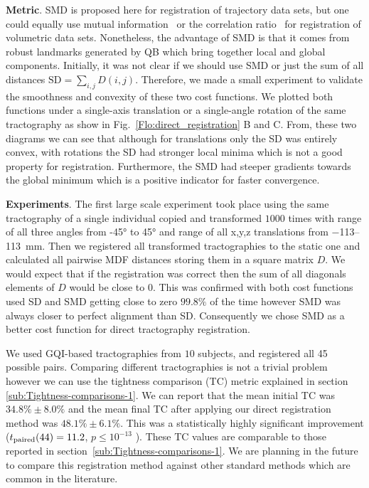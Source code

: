 \documentclass[preprint,authoryear,a4paper,10pt,onecolumn]{elsarticle}
\begin{document}
\textbf{Metric}. SMD is proposed here for registration of trajectory
data sets, but one could equally use mutual
information~\citep{maes1997multimodality} or the correlation
ratio~\citep{roche1998correlation} for registration of volumetric data
sets. Nonetheless, the advantage of SMD is that it comes from robust
landmarks generated by QB which bring together local and global
components. Initially, it was not clear if we should use SMD or just the
sum of all distances $\mathrm{SD}=\sum_{i,j}D(i,j)$. Therefore, we made
a small experiment to validate the smoothness and convexity of these two
cost functions. We plotted both functions under a single-axis
translation or a single-angle rotation of the same tractography as show
in Fig.~\ref{Flo:direct_registration} B and C. From, these two diagrams
we can see that although for translations only the SD was entirely
convex, with rotations the SD had stronger local minima which is not a
good property for registration. Furthermore, the SMD had steeper
gradients towards the global minimum which is a positive indicator for
faster convergence.

\textbf{Experiments}. The first large scale experiment took place using
the same tractography of a single individual copied and transformed
$1000$ times with range of all three angles from \ang{-45} to \ang{45}
and range of all x,y,z translations from \numrange{-113}{113}~mm. Then
we registered all transformed tractographies to the static one and
calculated all pairwise MDF distances storing them in a square matrix
$D$. We would expect that if the registration was correct then the sum
of all diagonals elements of $D$ would be close to $0$. This was
confirmed with both cost functions used SD and SMD getting close to zero
$99.8\%$ of the time however SMD was always closer to perfect alignment
than SD. Consequently we chose SMD as a better cost function for direct
tractography registration.

We used GQI-based tractographies from $10$ subjects, and registered all
45 possible pairs. Comparing different tractographies is not a trivial
problem however we can use the tightness comparison (TC) metric
explained in section \ref{sub:Tightness-comparisons-1}.  We can report
that the mean initial TC was $34.8\%\pm8.0\%$ and the mean final TC
after applying our direct registration method was $48.1\%\pm6.1\%$. This
was a statistically highly significant improvement
($t_{\text{\textrm{paired}}}(44)=11.2$, $p\leq10^{-13}$ ). These TC
values are comparable to those reported in
section~\ref{sub:Tightness-comparisons-1}. We are planning in the future
to compare this registration method against other standard methods which
are common in the literature.
\end{document}
